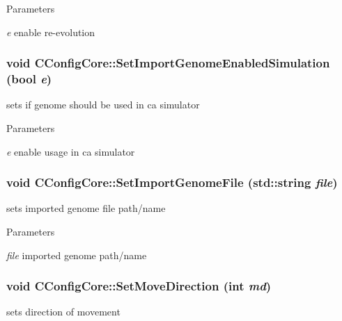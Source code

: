 \begin{DoxyParams}{Parameters}
\item[{\em e}]enable re-\/evolution \end{DoxyParams}
\hypertarget{classCConfigCore_a8b868c4f18c8d14fc6132dedce0de6dd}{
\subsubsection[{SetImportGenomeEnabledSimulation}]{\setlength{\rightskip}{0pt plus 5cm}void CConfigCore::SetImportGenomeEnabledSimulation (bool {\em e})}}
\label{classCConfigCore_a8b868c4f18c8d14fc6132dedce0de6dd}
sets if genome should be used in ca simulator


\begin{DoxyParams}{Parameters}
\item[{\em e}]enable usage in ca simulator \end{DoxyParams}
\hypertarget{classCConfigCore_a1a7590056fad40d5a2f0cdd2c241ae54}{
\subsubsection[{SetImportGenomeFile}]{\setlength{\rightskip}{0pt plus 5cm}void CConfigCore::SetImportGenomeFile (std::string {\em file})}}
\label{classCConfigCore_a1a7590056fad40d5a2f0cdd2c241ae54}
sets imported genome file path/name


\begin{DoxyParams}{Parameters}
\item[{\em file}]imported genome path/name \end{DoxyParams}
\hypertarget{classCConfigCore_a88d67351c9c94a3a8c95b38163958989}{
\subsubsection[{SetMoveDirection}]{\setlength{\rightskip}{0pt plus 5cm}void CConfigCore::SetMoveDirection (int {\em md})}}
\label{classCConfigCore_a88d67351c9c94a3a8c95b38163958989}
sets direction of movement


